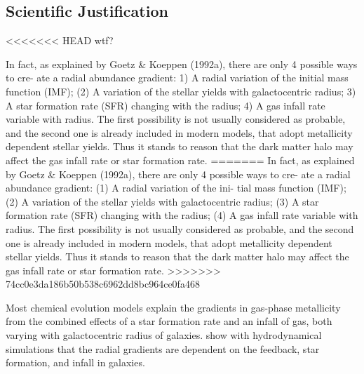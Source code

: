 \documentclass[11pt, a4paper, onecolumn]{article}
\begin{document}

\begin{multicols}{2}

\section{Scientific Justification}

<<<<<<< HEAD
    wtf?

    \citet{sanchez12} In fact, as explained by Goetz \& Koeppen (1992a), there
    are only 4 possible ways to cre- ate a radial abundance gradient: 1) A
    radial variation of the initial mass function (IMF); (2) A variation of the
    stellar yields with galactocentric radius; 3) A star formation rate (SFR)
    changing with the radius; 4) A gas infall rate variable with radius.  The
    first possibility is not usually considered as probable, and the second one
    is already included in modern models, that adopt metallicity dependent
    stellar yields. Thus it stands to reason that the dark matter halo may
    affect the gas infall rate or star formation rate.
=======
    \citet{sanchez12} In fact, as explained by Goetz \& Koeppen (1992a),
    there are only 4 possible ways to cre- ate a radial abundance gradient:
    (1) A radial variation of the ini- tial mass function (IMF); (2) A
    variation of the stellar yields with galactocentric radius; (3) A star
    formation rate (SFR) changing with the radius; (4) A gas infall rate
    variable with radius.  The first possibility is not usually considered as
    probable, and the second one is already included in modern models, that
    adopt metallicity dependent stellar yields. Thus it stands to reason that
    the dark matter halo may affect the gas infall rate or star formation
    rate.
>>>>>>> 74cc0e3da186b50b538c6962dd8bc964ce0fa468

    Most chemical evolution models explain the gradients in gas-phase
    metallicity from the combined effects of a star formation rate and an
    infall of gas, both varying with galactocentric radius of galaxies.
    \citet{gibson13} show with hydrodynamical simulations that the radial
    gradients are dependent on the feedback, star formation, and infall in
    galaxies.


\end{multicols}
\end{document}
